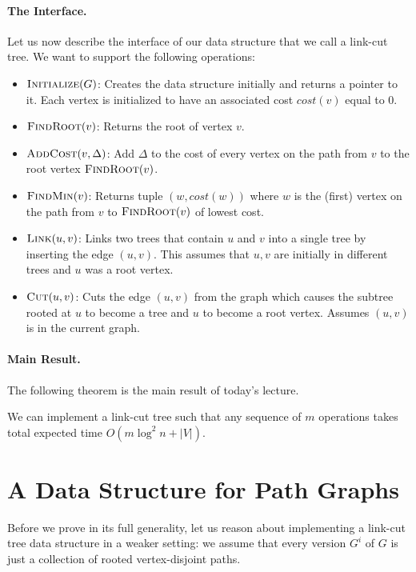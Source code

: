 \paragraph{The Interface.} Let us now describe the interface of our data structure that we call a link-cut tree. We want to support the following operations:
\begin{itemize}
    \item $\textsc{Initialize}(G)$: Creates the data structure initially and returns a pointer to it. Each vertex is initialized to have an associated cost $cost(v)$ equal to $0$.
    \item $\textsc{FindRoot}(v)$: Returns the root of vertex $v$. 
    \item $\textsc{AddCost}(v, \Delta)$: Add $\Delta$ to the cost of every vertex on the path from $v$ to the root vertex $\textsc{FindRoot}(v)$.
    \item $\textsc{FindMin}(v)$: Returns tuple $(w, cost(w))$ where $w$ is the (first) vertex on the path from $v$ to $\textsc{FindRoot}(v)$ of lowest cost. 
    \item $\textsc{Link}(u,v)$: Links two trees that contain $u$ and $v$ into a single tree by inserting the edge $(u,v)$. This assumes that $u, v$ are initially in different trees and $u$ was a root vertex.
    \item $\textsc{Cut}(u,v)$: Cuts the edge $(u,v)$ from the graph which causes the subtree rooted at $u$ to become a tree and $u$ to become a root vertex. Assumes $(u,v)$ is in the current graph.
\end{itemize}

\paragraph{Main Result.} The following theorem is the main result of today's lecture.

\begin{theorem}\label{thm:mainTheoremLinkCutTree}
We can implement a link-cut tree such that any sequence of $m$ operations takes total expected time $O(m \log^2 n + |V|)$.
\end{theorem}

\section{A Data Structure for Path Graphs}

Before we prove  in its full generality, let us reason about implementing a link-cut tree data structure in a weaker setting: we assume that every version $G^i$ of $G$ is just a collection of rooted vertex-disjoint paths.

